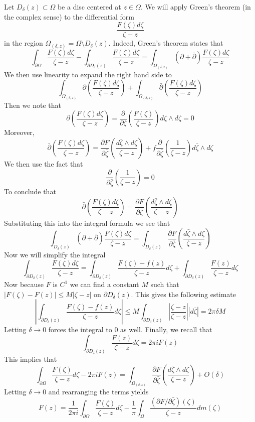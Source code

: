 \documentclass{article}
\newcommand{\exercise}[1]{\noindent{\textbf{Exercise #1:}}}
\newcommand{\der}[2]{\frac{\partial #1}{\partial #2}}
\begin{document}
Let $D_\delta(z) \subset \Omega$ be a disc centered at $z \in
\Omega$. We will apply Green's theorem (in the complex sense) to the
differential form
\[
\frac{F(\zeta) d\zeta}{\zeta - z}
\]
in the region $\Omega_{(\delta,z)} = \Omega \setminus
D_{\delta}(z)$. Indeed, Green's theorem states that
\[
\int_{\partial \Omega} \frac{F(\zeta) d\zeta}{\zeta - z} -
\int_{\partial D_{\delta}(z)} \frac{F(\zeta) d\zeta}{\zeta - z} =
\int_{\Omega_{(\delta,z)}} (\partial + \bar{\partial})\frac{F(\zeta)
  d\zeta}{\zeta - z}
\]
We then use linearity to expand the right hand side to
\[
\int_{\Omega_{(\delta,z)}} \partial\left(\frac{F(\zeta) d\zeta}{\zeta
    - z}\right) + \int_{\Omega_{(\delta,z)}}
\bar{\partial}\left(\frac{F(\zeta) d\zeta}{\zeta - z}\right)
\]
Then we note that
\[
\partial\left(\frac{F(\zeta) d\zeta}{\zeta - z}\right) =
\der{}{\zeta}\left(\frac{F(\zeta)}{\zeta - z}\right)d\zeta \wedge
d\zeta = 0
\]
Moreover,
\[
\bar{\partial}\left(\frac{F(\zeta) d\zeta}{\zeta - z}\right) =
\der{F}{\bar{\zeta}}\left(\frac{d\bar{\zeta}\wedge d\zeta}{\zeta -
    z}\right) + f\der{}{\bar{\zeta}}\left(\frac{1}{\zeta -
    z}\right)d\bar{\zeta}\wedge d\zeta
\]
We then use the fact that
\[
\der{}{\bar{\zeta}}\left(\frac{1}{\zeta - z}\right) = 0
\]
To conclude that
\[
\bar{\partial}\left(\frac{F(\zeta) d\zeta}{\zeta - z}\right) =
\der{F}{\bar{\zeta}}\left(\frac{d\bar{\zeta}\wedge d\zeta}{\zeta -
    z}\right)
\]
Substituting this into the integral formula we see that
\[
\int_{D_\delta(z)} (\partial + \bar{\partial})\frac{F(\zeta)
  d\zeta}{\zeta - z} = \int_{D_\delta(z)}
\der{F}{\bar{\zeta}}\left(\frac{d\bar{\zeta}\wedge d\zeta}{\zeta -
    z}\right)
\]
Now we will simplify the integral
\[
\int_{\partial D_\delta(z)} \frac{F(\zeta) d\zeta}{\zeta - z} =
\int_{\partial D_{\delta}(z)} \frac{F(\zeta) - f(z)}{\zeta - z}d\zeta
+ \int_{\partial D_\delta(z)} \frac{F(z)}{\zeta - z}d\zeta
\]
Now because $F$ is $C^1$ we can find a constant $M$ such that
$|F(\zeta) - F(z)| \leq M|\zeta - z|$ on $\partial D_{\delta}(z)$. This
gives the following estimate
\[
\left| \int_{\partial D_{\delta}(z)} \frac{F(\zeta) - f(z)}{\zeta -
    z}d\zeta\right| \leq M\int_{\partial
  D_{\delta}(z)}\left|\frac{\zeta -z}{\zeta -z}\right| |d\bar{\zeta}|
= 2\pi \delta M
\]
Letting $\delta \to 0$ forces the integral to 0 as well. Finally, we recall that
\[
\int_{\partial D_{\delta}(z)} \frac{F(z)}{\zeta - z}d\zeta = 2\pi
iF(z)
\]
This implies that
\[
\int_{\partial \Omega} \frac{F(\zeta)}{\zeta - z}d\zeta - 2\pi iF(z) =
\int_{\Omega_{(\delta,z)}}
\der{F}{\bar{\zeta}}\left(\frac{d\bar{\zeta}\wedge d\zeta}{\zeta -
    z}\right) + O(\delta)
\]
Letting $\delta \to 0$ and rearranging the terms yields
\[
F(z) = \frac{1}{2\pi i}\int_{\partial \Omega} \frac{F(\zeta)}{\zeta -
  z}d\zeta - \frac{1}{\pi}\int_\Omega \frac{(\partial
  F/\partial\bar{\zeta})(\zeta)}{\zeta - z}dm(\zeta)
\]

\exercise{7.9.7}
\end{document}
